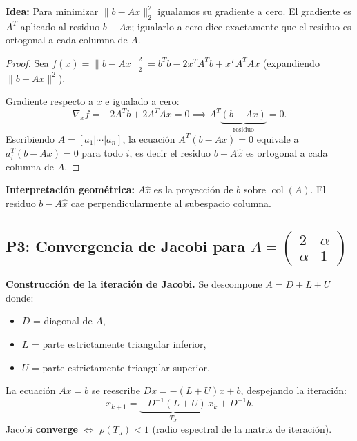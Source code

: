 \documentclass[11pt,a4paper]{article}
\begin{document}
\textbf{Idea:} Para minimizar $\|b-Ax\|_2^2$ igualamos su gradiente a cero. El gradiente es $A^T$ aplicado al residuo $b-Ax$; igualarlo a cero dice exactamente que el residuo es ortogonal a cada columna de $A$.

\begin{proof}
Sea $f(x) = \|b-Ax\|_2^2 = b^Tb - 2x^TA^Tb + x^TA^TAx$ (expandiendo $\|b-Ax\|^2$).

Gradiente respecto a $x$ e igualado a cero:
\[
  \nabla_x f = -2A^Tb + 2A^TAx = 0 \implies A^T\underbrace{(b-Ax)}_{\text{residuo}} = 0.
\]
Escribiendo $A = [a_1|\cdots|a_n]$, la ecuación $A^T(b-Ax)=0$ equivale a
$a_i^T(b-Ax)=0$ para todo $i$, es decir el residuo $b-A\hat{x}$ es ortogonal a cada columna de $A$.
\end{proof}

\textbf{Interpretación geométrica:} $A\hat{x}$ es la proyección de $b$ sobre $\operatorname{col}(A)$. El residuo $b-A\hat{x}$ cae perpendicularmente al subespacio columna.

\subsection{P3: Convergencia de Jacobi para $A = \begin{pmatrix}2&\alpha\\\alpha&1\end{pmatrix}$}
\label{sec:pt2_2016_p3}

\textbf{Construcción de la iteración de Jacobi.} Se descompone $A = D + L + U$ donde:
\begin{itemize}[noitemsep]
  \item $D$ = diagonal de $A$,
  \item $L$ = parte estrictamente triangular inferior,
  \item $U$ = parte estrictamente triangular superior.
\end{itemize}
La ecuación $Ax = b$ se reescribe $Dx = -(L+U)x + b$, despejando la iteración:
\[
  x_{k+1} = \underbrace{-D^{-1}(L+U)}_{T_J}\,x_k + D^{-1}b.
\]
Jacobi \textbf{converge} $\Leftrightarrow$ $\rho(T_J) < 1$ (radio espectral de la matriz de iteración).
\end{document}

